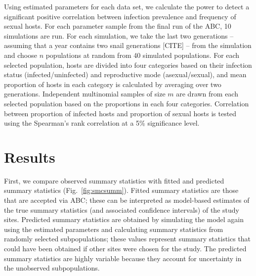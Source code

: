 \documentclass{article}\usepackage[]{graphicx}\usepackage[]{color}
\newcommand{\fref}[1]{Fig.~\ref{fig:#1}}
\begin{document}
Using estimated parameters for each data set, we calculate the power to detect a significant positive correlation between infection prevalence and frequency of sexual hosts.
For each parameter sample from the final run of the ABC, 10 simulations are run.
For each simulation, we take the last two generations -- assuming that a year contains two snail generations [CITE] -- from the simulation and choose $n$ populations at random from 40 simulated populations.
For each selected population, hosts are divided into four categories based on their infection status (infected/uninfected) and reproductive mode (asexual/sexual),
and mean proportion of hosts in each category is calculated by averaging over two generations.
Independent multinomial samples of size $m$ are drawn from each selected population based on the proportions  in each four categories. 
Correlation between proportion of infected hosts and proportion of sexual hosts is tested using the Spearman's rank correlation at a 5\% significance level.

\section{Results}

First, we compare observed summary statistics with fitted and predicted summary statistics (\fref{smcsumm}).
Fitted summary statistics are those that are accepted via ABC;
these can be interpreted as model-based estimates of the true summary statistics (and associated confidence intervals) of the study sites.
Predicted summary statistics are obtained by simulating the model again using the estimated parameters and calculating summary statistics from randomly selected subpopulations;
these values represent summary statistics that could have been obtained if other sites were chosen for the study.
The predicted summary statistics are highly variable because they account for uncertainty in the unobserved subpopulations.
\end{document}
